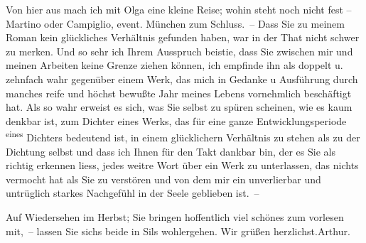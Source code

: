 \pstart
           Von hier aus mach ich mit Olga eine kleine
               Reise; wohin steht noch nicht fest – Martino
               oder Campiglio, event. München zum Schluss. – Dass Sie zu {\pb}meinem Roman kein
               glückliches Verhältnis gefunden haben, war in der That nicht schwer zu merken. Und so
               sehr ich Ihrem Ausspruch beisti{\geminationm}e, dass Sie zwischen mir
               und meinen Arbeiten keine Grenze ziehen können, ich empfinde ihn als doppelt u.
               zehnfach wahr gegenüber einem Werk, das mich in Gedanke u Ausführung durch manches
               reife und \introOben{}höchst\introOben{} bewußte Jahr meines Lebens vornehmlich
               beschäftigt hat. Als so wahr erweist es sich, was Sie selbst zu spüren scheinen, wie
               es kaum denkbar ist, zum Dichter eines Werks, das für eine {\pb}ganze Entwicklungsperiode \substVorne{}\textsuperscript{eines}\substDazwischen{}\label{T_L01786-1v}\label{T_L01786-1}\substHinten{} Dichters bedeutend ist, in einem glücklichern Verhältnis zu stehen als zu
               der Dichtung selbst und dass ich Ihnen für den Takt dankbar bin, der es Sie als
               richtig erkennen liess, jedes weitre Wort über ein Werk zu unterlassen, das nichts vermocht hat als Sie zu verstören und von
               dem mir ein unverlierbar und untrüglich starkes \introOben{}\strikeout{\textcolor{gray}{×}\-\textcolor{gray}{×}\-\textcolor{gray}{×}\-\textcolor{gray}{×}\-\textcolor{gray}{×}\-\textcolor{gray}{×}\-\textcolor{gray}{×}\-\textcolor{gray}{×}\-\textcolor{gray}{×}\-\textcolor{gray}{×}}\introOben{} Nachgefühl in der Seele geblieben ist. –\pend
           
\pstart
           Auf Wiedersehen im Herbst; Sie bringen hoffentlich viel schönes zum
               vorlesen mit, – lassen Sie sichs beide in Sils
               wohlergehen.\pend
           \pstart Wir grüßen herzlichst.\spacefill\mbox{Arthur.}\pend{}\endnumbering{}  
      